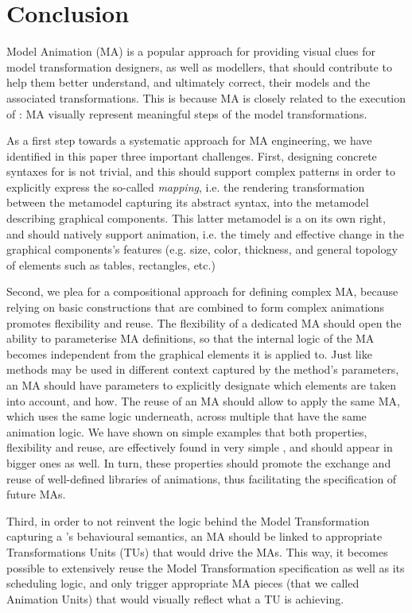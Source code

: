 \section{Conclusion}
\label{sec:Conclusion}

Model Animation (MA) is a popular approach for providing visual clues for model transformation
designers, as well as modellers, that should contribute to help them better 
understand, and ultimately correct, their models and the associated transformations.
This is because MA is closely related to the execution of \DSLs: MA visually represent
meaningful steps of the model transformations. 

As a first step towards a systematic approach for MA engineering, we have 
identified in this paper three important challenges. 
First, designing concrete syntaxes for \DSLs is not trivial, and this should support
complex patterns in order to explicitly express the so-called \emph{mapping}, i.e.
the rendering transformation between the \DSL metamodel capturing its abstract syntax,
into the metamodel describing graphical components. This latter metamodel is a \DSL
on its own right, and should natively support animation, i.e. the timely and 
effective change in the graphical components's features (e.g. size, color, thickness,
and general topology of elements such as tables, rectangles, etc.)

Second, we plea for a compositional approach for defining complex MA, because relying
on basic constructions that are combined to form complex animations promotes flexibility
and reuse. The flexibility of a dedicated MA \DSL should open the ability to 
parameterise MA definitions, so that the internal logic of the MA becomes independent
from the graphical elements it is applied to. Just like methods may be used in 
different context captured by the method's parameters, an MA should have parameters
to explicitly designate which elements are taken into account, and how. The reuse
of an MA \DSL should allow to apply the same MA, which uses the same logic underneath,
across multiple \DSLs that have the same animation logic. We have shown on simple
examples that both properties, flexibility and reuse, are effectively found in
very simple \DSLs, and should appear in bigger ones as well. In turn, these properties
should promote the exchange and reuse of well-defined libraries of animations, thus
facilitating the specification of future MAs.

Third, in order to not reinvent the logic behind the Model Transformation capturing
a \DSL's behavioural semantics, an MA should be linked to appropriate Transformations
Units (TUs) that would drive the MAs. This way, it becomes possible to extensively
reuse the Model Transformation specification as well as its scheduling logic, and
only trigger appropriate MA pieces (that we called Animation Units) that would
visually reflect what a TU is achieving. 

